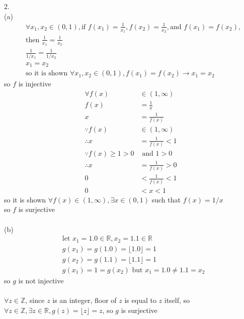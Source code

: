 \documentclass[12pt, border = 4pt, multi]{article} %
\begin{document}
\\
\\
2.\\
(a)
\begin{align*}
&\forall x_1, x_2 \in (0, 1), \text{if } f(x_1) = \frac{1}{x_1}, f(x_2) = \frac{1}{x_2}, \text{and } f(x_1) =f(x_2),\\
&\text{then } \frac{1}{x_1} = \frac{1}{x_2}\\
&\frac{1}{1 / x_1} = \frac{1}{1 / x_2}\\
&x_1 = x_2\\
&\text{so it is shown } \forall x_1, x_2 \in (0, 1), f(x_1) = f(x_2) \rightarrow x_1 = x_2
\end{align*}
so $f$ is injective
\begin{align*}
\forall f(x) &\in (1, \infty)\\
f(x) &= \frac{1}{x}\\
x &= \frac{1}{f(x)}\\
\because f(x) &\in (1, \infty)\\
\therefore x &= \frac{1}{f(x)} < 1\\
\because f(x) \geq 1 > 0 &\text{ and } 1 > 0\\
\therefore x &= \frac{1}{f(x)} > 0\\
0 &< \frac{1}{f(x)} < 1\\
0 &< x < 1
\end{align*}
so it is shown $\forall f(x) \in (1, \infty), \exists x \in (0, 1)$ such that $f(x) = 1 / x$\\
so $f$ is surjective\\
\\
(b)\\
\begin{align*}
&\text{let } x_1 = 1.0 \in \mathbb{R}, x_2 = 1.1 \in \mathbb{R}\\
&g(x_1) = g(1.0) = \lfloor 1.0 \rfloor = 1\\
&g(x_2) = g(1.1) = \lfloor 1.1 \rfloor = 1\\
&g(x_1) = 1 = g(x_2) \text{ but } x_1 = 1.0 \not= 1.1 = x_2
\end{align*}
so $g$ is not injective\\
\\
$\forall z \in \mathbb{Z}$, since $z$ is an integer, floor of $z$ is equal to $z$ itself, so $\forall z \in \mathbb{Z}, \exists z \in \mathbb{R}, g(z) = \lfloor z \rfloor = z$, so $g$ is surjective\\
\\
\\
\\
\end{document}
